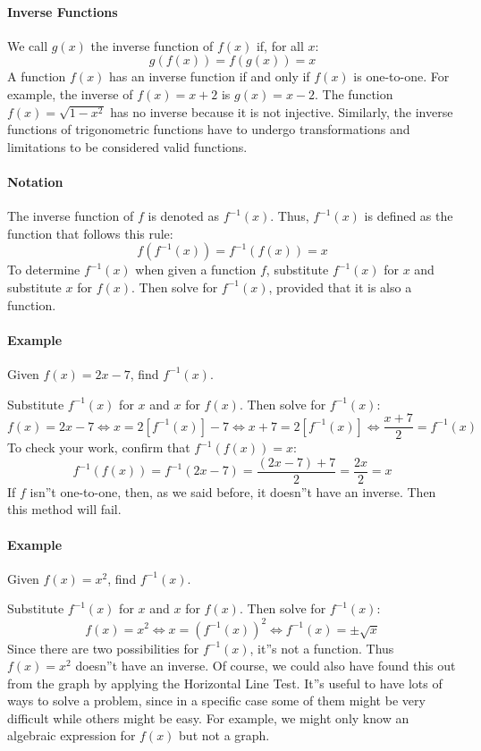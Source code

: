 \paragraph{Inverse Functions}

We call $g(x)$ the inverse function of $f(x)$ if, for all $x$:
$$
g(f(x)) = f(g(x)) = x
$$
A function $f(x)$ has an inverse function if and only if $f(x)$ is one-to-one. For example, the inverse of $f(x) = x + 2$ is $g(x) = x - 2$. The function $f(x) = \sqrt{1 - x^2}$ has no inverse because it is not injective. Similarly, the inverse functions of trigonometric functions have to undergo transformations and limitations to be considered valid functions.

\paragraph{Notation}

The inverse function of $f$ is denoted as $f^{-1}(x)$. Thus, $f^{-1}(x)$ is defined as the function that follows this rule:
$$
f(f^{-1}(x)) = f^{-1}(f(x)) = x
$$
To determine $f^{-1}(x)$ when given a function $f$, substitute $f^{-1}(x)$ for $x$ and substitute $x$ for $f(x)$. Then solve for $f^{-1}(x)$, provided that it is also a function.

\paragraph{Example}

Given $f(x) = 2x - 7$, find $f^{-1}(x)$.

Substitute $f^{-1}(x)$ for $x$ and $x$ for $f(x)$. Then solve for $f^{-1}(x)$:
$$
f(x) = 2x - 7 \Leftrightarrow x = 2[f^{-1}(x)] - 7 \Leftrightarrow x + 7 = 2[f^{-1}(x)] \Leftrightarrow \frac{x + 7}{2} = f^{-1}(x)
$$
To check your work, confirm that $f^{-1}(f(x)) = x$:
$$
f^{-1}(f(x)) = f^{-1}(2x - 7) = \frac{(2x - 7) + 7}{2} = \frac{2x}{2} = x
$$
If $f$ isn''t one-to-one, then, as we said before, it doesn''t have an inverse. Then this method will fail.

\paragraph{Example}

Given $f(x) = x^2$, find $f^{-1}(x)$.

Substitute $f^{-1}(x)$ for $x$ and $x$ for $f(x)$. Then solve for $f^{-1}(x)$:
$$
f(x) = x^2 \Leftrightarrow x = (f^{-1}(x))^2 \Leftrightarrow f^{-1}(x) = \pm \sqrt{x}
$$
Since there are two possibilities for $f^{-1}(x)$, it''s not a function. Thus $f(x) = x^2$ doesn''t have an inverse. Of course, we could also have found this out from the graph by applying the Horizontal Line Test. It''s useful to have lots of ways to solve a problem, since in a specific case some of them might be very difficult while others might be easy. For example, we might only know an algebraic expression for $f(x)$ but not a graph.

